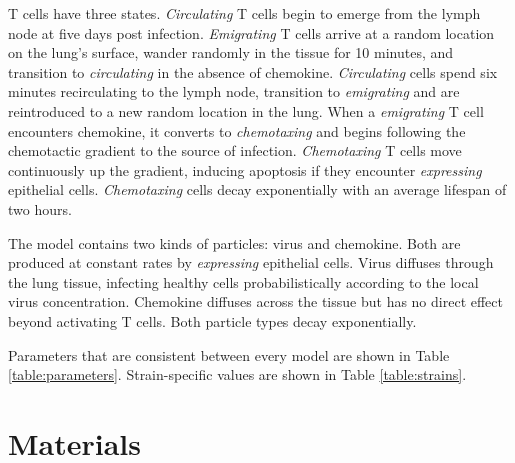 \documentclass[10pt]{article}
\begin{document}
T cells have three states. \emph{Circulating} T cells begin to emerge from the lymph node at five days post infection. \textit{Emigrating} T cells arrive at a random location on the lung's surface, wander randomly in the tissue for 10 minutes, and transition to \emph{circulating} in the absence of chemokine. \emph{Circulating} cells spend six minutes recirculating to the lymph node, transition to \emph{emigrating} and are reintroduced to a new random location in the lung. When a \emph{emigrating} T cell encounters chemokine, it converts to \emph{chemotaxing} and begins following the chemotactic gradient to the source of infection. \emph{Chemotaxing} T cells move continuously up the gradient, inducing apoptosis if they encounter \emph{expressing} epithelial cells. \emph{Chemotaxing} cells decay exponentially with an average lifespan of two hours. 

The model contains two kinds of particles: virus and chemokine. Both are produced at constant rates by \emph{expressing} epithelial cells.  Virus diffuses through the lung tissue, infecting healthy cells probabilistically according to the local virus concentration. Chemokine diffuses across the tissue but has no
direct effect beyond activating T cells. Both particle types decay exponentially.

Parameters that are consistent between every model are shown in Table \ref{table:parameters}.  Strain-specific values are shown in Table \ref{table:strains}.

\section*{Materials}
\end{document}
